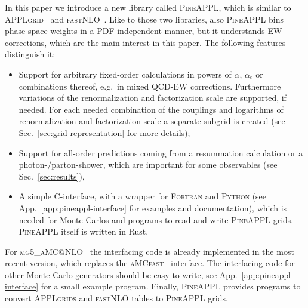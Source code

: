 In this paper we introduce a new library called \textsc{PineAPPL}, which is similar to \textsc{APPLgrid}~\cite{Carli:2010rw} and \textsc{fastNLO}~\cite{Kluge:2006xs,Wobisch:2011ij,Britzger:2012bs}.
Like to those two libraries, also \textsc{PineAPPL} bins phase-space weights in a PDF-independent manner, but it understands EW corrections, which are the main interest in this paper.
The following features distinguish it:
\begin{itemize}
\item Support for arbitrary fixed-order calculations in powers of $\alpha$, $\alpha_\mathrm{s}$ or combinations thereof, e.g.\ in mixed QCD-EW corrections.
Furthermore variations of the renormalization and factorization scale are supported, if needed.
For each needed combination of the couplings and logarithms of renormalization and factorization scale a separate subgrid is created (see Sec.~\ref{sec:grid-representation} for more details);
\item Support for all-order predictions coming from a resummation calculation or a photon-/parton-shower, which are important for some observables (see Sec.~\ref{sec:results}),
\item A simple \textsc{C}-interface, with a wrapper for \textsc{Fortran} and \textsc{Python} (see App.~\ref{app:pineappl-interface} for examples and documentation), which is needed for Monte Carlos and programs to read and write \textsc{PineAPPL} grids.
\textsc{PineAPPL} itself is written in Rust.
\end{itemize}
For \textsc{mg5\_aMC@NLO}~\cite{Alwall:2014hca,Frederix:2018nkq} the interfacing code is already implemented in the most recent version, which replaces the \textsc{aMCfast}~\cite{Bertone:2014zva} interface.
The interfacing code for other Monte Carlo generators should be easy to write, see App.~\ref{app:pineappl-interface} for a small example program.
Finally, \textsc{PineAPPL} provides programs to convert \textsc{APPLgrids} and \textsc{fastNLO} tables to \textsc{PineAPPL} grids.

